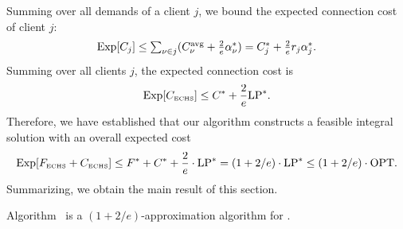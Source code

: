 Summing over all demands of a client $j$, we bound the
expected connection cost of client $j$:
%
\begin{equation*}
  \mbox{\rm Exp}[C_j] \leq {\textstyle\sum_{\nu\in j} (C^{{\mbox{\scriptsize\rm avg}}}_{\nu} + \frac{2}{e}\alpha_{\nu}^\ast) }
  = \textstyle{ C_j^\ast + \frac{2}{e}r_j\alpha_j^\ast}.
\end{equation*}
%
Summing over all clients $j$, the expected connection
cost is
%
\begin{equation*}
	 \mbox{\rm Exp}[ C_{\mbox{\tiny\rm ECHS}}] \le C^\ast +
\frac{2}{e}\mbox{\rm LP}^\ast.
\end{equation*}
% 
Therefore, we have established that
our algorithm constructs a feasible integral solution with
an overall expected cost 
%
\begin{equation*}
  \label{eq:chudakall}
	 \mbox{\rm Exp}[ F_{\mbox{\tiny\rm ECHS}} + C_{\mbox{\tiny\rm ECHS}}]
	\le
  	F^\ast + C^\ast + \frac{2}{e}\cdot \mbox{\rm LP}^\ast = (1+2/e)\cdot \mbox{\rm LP}^\ast
  \leq (1+2/e)\cdot \mbox{\rm OPT}.
\end{equation*}
%
Summarizing, we obtain the main result of this section.

\begin{theorem}\label{thm:1736}
  Algorithm~{\ECHS} is a $(1+2/e)$-approximation algorithm for \FTFP.
\end{theorem}